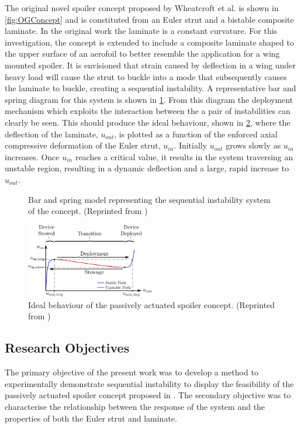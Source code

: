 \documentclass{IEEEtran}
\begin{document}
		The original novel spoiler concept proposed by Wheatcroft et al. is shown in \cref{fig:OGConcept} and is constituted from an Euler strut and a bistable composite laminate. In the original work the laminate is a constant curvature. For this investigation, the concept is extended to include a composite laminate shaped to the upper surface of an aerofoil to better resemble the application for a wing mounted spoiler. It is envisioned that strain caused by deflection in a wing under heavy load will cause the strut to buckle into a mode that subsequently causes the laminate to buckle, creating a sequential instability. A representative bar and spring diagram for this system is shown in \cref{fig:BarNSpring}. From this diagram the deployment mechanism which exploits the  interaction between the a pair of instabilities can clearly be seen. This should produce the ideal behaviour, shown in \cref{fig:DesiredPath}, where the deflection of the laminate, $u_{out}$, is plotted as a function of the enforced axial compressive deformation of the Euler strut, $u_{in}$. Initially $u_{out}$ grows slowly as $u_{in}$ increases. Once $u_{in}$  reaches a critical value, it results in the system traversing an unstable region, resulting in a dynamic deflection and a large, rapid increase to $u_{out}$.

		\begin{figure}[!h]
			\centering
			
			\caption{\centering Bar and spring model representing the sequential instability system of the concept. (Reprinted from \cite{Wheatcroft_2023})}
			\label{fig:BarNSpring}
		\end{figure}
	
		\begin{figure}[!h]
			\centering
			\includegraphics[width=0.5\textwidth]{IntroductionImages/Desired_Path_V4.png}
			\caption{\centering Ideal behaviour of the passively actuated spoiler concept. (Reprinted from \cite{Wheatcroft_2023})}
			\label{fig:DesiredPath}
		\end{figure}
       
	  \subsection{Research Objectives}
        The primary objective of the present work was to develop a method to experimentally demonstrate sequential instability to display the feasibility of the passively actuated spoiler concept proposed in \cite{Wheatcroft_2023}. The secondary objective was to characterise the relationship between the response of the system and the properties of both the Euler strut and laminate. 
   
\end{document}
